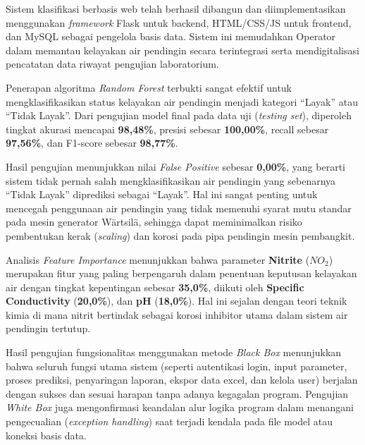 \begin{packed_enum}
    \item Sistem klasifikasi berbasis web telah berhasil dibangun dan diimplementasikan menggunakan \textit{framework} Flask untuk backend, HTML/CSS/JS untuk frontend, dan MySQL sebagai pengelola basis data. Sistem ini memudahkan Operator dalam memantau kelayakan air pendingin secara terintegrasi serta mendigitalisasi pencatatan data riwayat pengujian laboratorium.
    \item Penerapan algoritma \textit{Random Forest} terbukti sangat efektif untuk mengklasifikasikan status kelayakan air pendingin menjadi kategori ``Layak'' atau ``Tidak Layak''. Dari pengujian model final pada data uji (\textit{testing set}), diperoleh tingkat akurasi mencapai \textbf{98,48\%}, presisi sebesar \textbf{100,00\%}, recall sebesar \textbf{97,56\%}, dan F1-score sebesar \textbf{98,77\%}.
    \item Hasil pengujian menunjukkan nilai \textit{False Positive} sebesar \textbf{0,00\%}, yang berarti sistem tidak pernah salah mengklasifikasikan air pendingin yang sebenarnya ``Tidak Layak'' diprediksi sebagai ``Layak''. Hal ini sangat penting untuk mencegah penggunaan air pendingin yang tidak memenuhi syarat mutu standar pada mesin generator W{\"a}rtsil{\"a}, sehingga dapat meminimalkan risiko pembentukan kerak (\textit{scaling}) dan korosi pada pipa pendingin mesin pembangkit.
    \item Analisis \textit{Feature Importance} menunjukkan bahwa parameter \textbf{Nitrite} ($NO_2$) merupakan fitur yang paling berpengaruh dalam penentuan keputusan kelayakan air dengan tingkat kepentingan sebesar \textbf{35,0\%}, diikuti oleh \textbf{Specific Conductivity} (\textbf{20,0\%}), dan \textbf{pH} (\textbf{18,0\%}). Hal ini sejalan dengan teori teknik kimia di mana nitrit bertindak sebagai korosi inhibitor utama dalam sistem air pendingin tertutup.
    \item Hasil pengujian fungsionalitas menggunakan metode \textit{Black Box} menunjukkan bahwa seluruh fungsi utama sistem (seperti autentikasi login, input parameter, proses prediksi, penyaringan laporan, ekspor data excel, dan kelola user) berjalan dengan sukses dan sesuai harapan tanpa adanya kegagalan program. Pengujian \textit{White Box} juga mengonfirmasi keandalan alur logika program dalam menangani pengecualian (\textit{exception handling}) saat terjadi kendala pada file model atau koneksi basis data.
\end{packed_enum}

